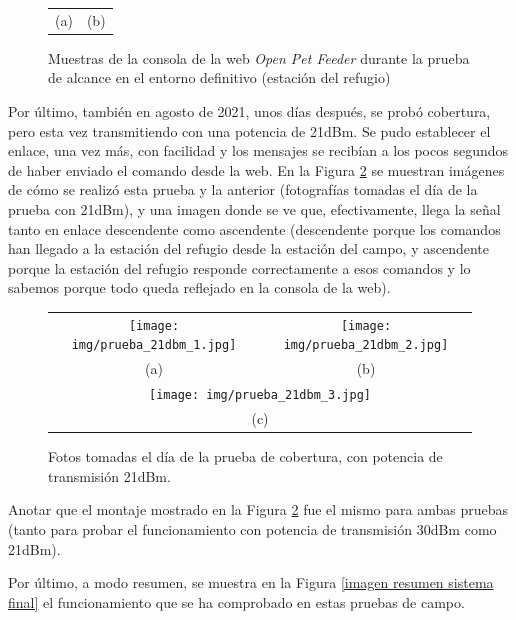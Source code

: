 \documentclass[12pt]{article}
\begin{document}
\begin{figure}[h!]
\begin{center}
\begin{tabular}{cc}
				(a)  & (b) \\[6pt]
			\end{tabular}
			\caption{Muestras de la consola de la web \textit{Open Pet Feeder} durante la prueba de alcance en el entorno definitivo (estación del refugio)}
			\label{captura web prueba cobertura}
		\end{center}
	\end{figure}

	\noindent Por último, también en agosto de 2021, unos días después, se probó cobertura, pero esta vez transmitiendo con una potencia de 21dBm. Se pudo establecer el enlace, una vez más, con facilidad y los mensajes se recibían a los pocos segundos de haber enviado el comando desde la web. En la Figura \ref{fotos prueba 21dbm} se muestran imágenes de cómo se realizó esta prueba y la anterior (fotografías tomadas el día de la prueba con 21dBm), y una imagen donde se ve que, efectivamente, llega la señal tanto en enlace descendente como ascendente (descendente porque los comandos han llegado a la estación del refugio desde la estación del campo, y ascendente porque la estación del refugio responde correctamente a esos comandos y lo sabemos porque todo queda reflejado en la consola de la web).\\
	
	
	\begin{figure}[h!]
		\begin{center}
			\begin{tabular}{cc}
				\texttt{[image: img/prueba\_21dbm\_1.jpg]} &   \texttt{[image: img/prueba\_21dbm\_2.jpg]} \\
				(a)  & (b)  \\[10pt]
				\multicolumn{2}{c}{\texttt{[image: img/prueba\_21dbm\_3.jpg]} }\\
				\multicolumn{2}{c}{(c)}
			\end{tabular}
			\caption{Fotos tomadas el día de la prueba de cobertura, con potencia de transmisión 21dBm.}
			\label{fotos prueba 21dbm}
		\end{center}
	\end{figure}
	
	\noindent Anotar que el montaje mostrado en la Figura \ref{fotos prueba 21dbm} fue el mismo para ambas pruebas (tanto para probar el funcionamiento con potencia de transmisión 30dBm como 21dBm).
	
	
	\noindent Por último, a modo resumen, se muestra en la Figura \ref{imagen resumen sistema final} el funcionamiento que se ha comprobado en estas pruebas de campo. \\
	
\end{document}
